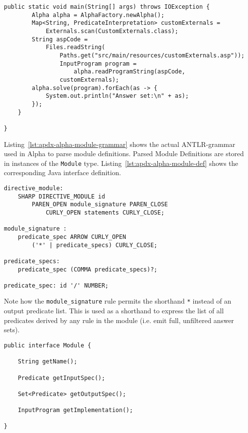 \begin{example}
\begin{lstlisting}[style=java, label={lst:user-supplied-externals-main}]
	public static void main(String[] args) throws IOException {
		Alpha alpha = AlphaFactory.newAlpha();
		Map<String, PredicateInterpretation> customExternals =
			Externals.scan(CustomExternals.class);
		String aspCode =
			Files.readString(
				Paths.get("src/main/resources/customExternals.asp"));
				InputProgram program =
					alpha.readProgramString(aspCode,
				customExternals);
		alpha.solve(program).forEach(as -> {
			System.out.println("Answer set:\n" + as);
		});
	}

}
\end{lstlisting}
\end{example}

\begin{example}
\label{ex:alpha-module-parsing}	
Listing~\ref{lst:apdx-alpha-module-grammar} shows the actual ANTLR-grammar used in Alpha to parse module definitions. Parsed Module Definitions are stored in instances of the \texttt{Module} type. Listing~\ref{lst:apdx-alpha-module-def} shows the corresponding Java interface definition.
\begin{lstlisting}[style=asp-code, label={lst:apdx-alpha-module-grammar}, caption={ANTLR grammar for module definitions}]
directive_module: 
	SHARP DIRECTIVE_MODULE id 
		PAREN_OPEN module_signature PAREN_CLOSE 
			CURLY_OPEN statements CURLY_CLOSE;

module_signature : 
	predicate_spec ARROW CURLY_OPEN 
		('*' | predicate_specs) CURLY_CLOSE;	

predicate_specs: 
	predicate_spec (COMMA predicate_specs)?;

predicate_spec: id '/' NUMBER;
\end{lstlisting}
Note how the \texttt{module\_signature} rule permits the shorthand \texttt{*} instead of an output predicate list.
This is used as a shorthand to express the list of all predicates derived by any rule in the module (i.e. emit full, unfiltered answer sets).	
\begin{lstlisting}[style=java, label={lst:apdx-alpha-module-def}, caption={Java interface specifying Alpha's internal representation of a module definition.}]
public interface Module {

	String getName();

	Predicate getInputSpec();

	Set<Predicate> getOutputSpec();

	InputProgram getImplementation();

}	
\end{lstlisting}	
\end{example}	
